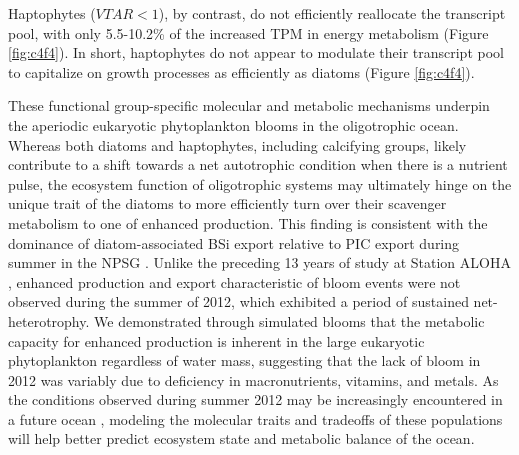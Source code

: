 Haptophytes ($VTAR < 1$), by contrast, do not efficiently reallocate the transcript pool, with only 5.5-10.2\% of the increased TPM in energy metabolism (Figure  \ref{fig:c4f4}). In short, haptophytes do not appear to modulate their transcript pool to capitalize on growth processes as efficiently as diatoms (Figure  \ref{fig:c4f4}). \par



These functional group-specific molecular and metabolic mechanisms underpin the aperiodic eukaryotic phytoplankton blooms in the oligotrophic ocean. Whereas both diatoms and haptophytes, including calcifying groups, likely contribute to a shift towards a net autotrophic condition when there is a nutrient pulse, the ecosystem function of oligotrophic systems may ultimately hinge on the unique trait of the diatoms to more efficiently turn over their scavenger metabolism to one of enhanced production. This finding is consistent with the dominance of diatom-associated BSi export relative to PIC export during summer in the NPSG \citep{Karl2012}. Unlike the preceding 13 years of study at Station ALOHA \citep{Karl2012}, enhanced production and export characteristic of bloom events were not observed during the summer of 2012, which exhibited a period of sustained net-heterotrophy. We demonstrated through simulated blooms that the metabolic capacity for enhanced production is inherent in the large eukaryotic phytoplankton regardless of water mass, suggesting that the lack of bloom in 2012 was variably due to deficiency in macronutrients, vitamins, and metals. As the conditions observed during summer 2012 may be increasingly encountered in a future ocean \citep{Doney2012}, modeling the molecular traits and tradeoffs of these populations will help better predict ecosystem state and metabolic balance of the ocean. \par








